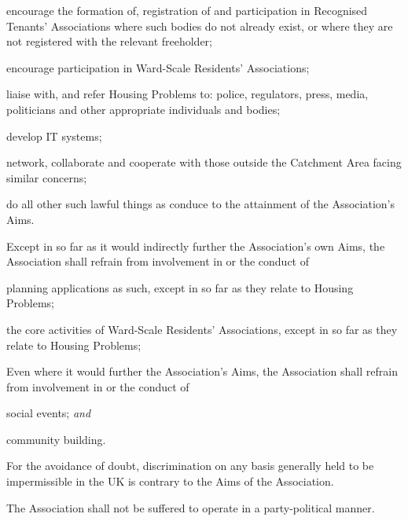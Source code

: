 \documentclass[12pt]{article}
\newcommand{\WSRA}[0]{Ward-Scale Residents' Association}
\newcommand{\RTA}[0]{Recognised Tenants' Association}
\newcommand{\avoiddoubt}[0]{For the avoidance of doubt}
\newcommand{\ITand}[0]{\textit{and}}
\begin{document}
\begin{constenum}
\begin{constenum}
  \item encourage the formation of, registration of and participation
    in \RTA{}s where such bodies do not already exist, or where they
    are not registered with the relevant freeholder;

  \item encourage participation in \WSRA{}s;

  \item liaise with, and refer Housing Problems to: police, regulators,
    press, media, politicians and other appropriate individuals and bodies;

  \item develop IT systems;

  \item network, collaborate and cooperate with those outside the
    Catchment Area facing similar concerns;

  \item do all other such lawful things as conduce to the attainment
    of the Association's Aims.
\end{constenum}

\item Except in so far as it would indirectly further the Association's own
  Aims, the Association shall refrain from involvement in or the conduct of
  \begin{constenum}
  \item planning applications as such, except in so far as they relate
    to Housing Problems;
  \item the core activities of \WSRA{}s, except in so far as they
    relate to Housing Problems;
  \end{constenum}

\item Even where it would further the Association's Aims, the Association
  shall refrain from involvement in or the conduct of
  \begin{constenum}
  \item social events; \ITand
  \item community building.
  \end{constenum}

\item \avoiddoubt, discrimination on any basis generally held to be
  impermissible in the UK is contrary to the Aims of the
  Association.

\item The Association shall not be suffered to operate in
  a party-political manner.

\end{constenum}
\end{document}
